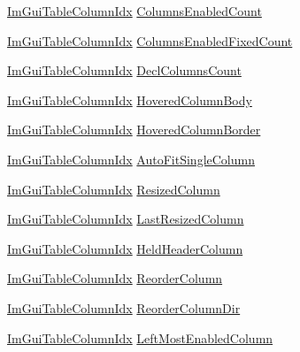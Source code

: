 \begin{DoxyCompactItemize}
\item 
\hyperlink{imgui__internal_8h_abe1882c8292cd23a77a54eda2407f147}{Im\+Gui\+Table\+Column\+Idx} \hyperlink{structImGuiTable_a51e7f9180f9739e52406c2192aa627f9}{Columns\+Enabled\+Count}
\item 
\hyperlink{imgui__internal_8h_abe1882c8292cd23a77a54eda2407f147}{Im\+Gui\+Table\+Column\+Idx} \hyperlink{structImGuiTable_aedc6edf409c9668781496fe16d19958b}{Columns\+Enabled\+Fixed\+Count}
\item 
\hyperlink{imgui__internal_8h_abe1882c8292cd23a77a54eda2407f147}{Im\+Gui\+Table\+Column\+Idx} \hyperlink{structImGuiTable_a8f405d885f74a82872edd0dab5790789}{Decl\+Columns\+Count}
\item 
\hyperlink{imgui__internal_8h_abe1882c8292cd23a77a54eda2407f147}{Im\+Gui\+Table\+Column\+Idx} \hyperlink{structImGuiTable_a3a94c100bab9cb7a01a02360aaf3b323}{Hovered\+Column\+Body}
\item 
\hyperlink{imgui__internal_8h_abe1882c8292cd23a77a54eda2407f147}{Im\+Gui\+Table\+Column\+Idx} \hyperlink{structImGuiTable_a1c47654491f288507621e4b2231b4f89}{Hovered\+Column\+Border}
\item 
\hyperlink{imgui__internal_8h_abe1882c8292cd23a77a54eda2407f147}{Im\+Gui\+Table\+Column\+Idx} \hyperlink{structImGuiTable_a393160a00b60d647071b9f2925e5161e}{Auto\+Fit\+Single\+Column}
\item 
\hyperlink{imgui__internal_8h_abe1882c8292cd23a77a54eda2407f147}{Im\+Gui\+Table\+Column\+Idx} \hyperlink{structImGuiTable_af1ef3df199510dd5210d6501ce6c3996}{Resized\+Column}
\item 
\hyperlink{imgui__internal_8h_abe1882c8292cd23a77a54eda2407f147}{Im\+Gui\+Table\+Column\+Idx} \hyperlink{structImGuiTable_ad5ceb30e1aef45ce269fc661c5e89281}{Last\+Resized\+Column}
\item 
\hyperlink{imgui__internal_8h_abe1882c8292cd23a77a54eda2407f147}{Im\+Gui\+Table\+Column\+Idx} \hyperlink{structImGuiTable_af90fbb7f2d6eba59a140c7dc9e163615}{Held\+Header\+Column}
\item 
\hyperlink{imgui__internal_8h_abe1882c8292cd23a77a54eda2407f147}{Im\+Gui\+Table\+Column\+Idx} \hyperlink{structImGuiTable_afe40dc28725db705210bd3a920aea591}{Reorder\+Column}
\item 
\hyperlink{imgui__internal_8h_abe1882c8292cd23a77a54eda2407f147}{Im\+Gui\+Table\+Column\+Idx} \hyperlink{structImGuiTable_a39d9e079bb8f4073e5b02806d890b59b}{Reorder\+Column\+Dir}
\item 
\hyperlink{imgui__internal_8h_abe1882c8292cd23a77a54eda2407f147}{Im\+Gui\+Table\+Column\+Idx} \hyperlink{structImGuiTable_aaf5f34705f41f958a897d211168f083f}{Left\+Most\+Enabled\+Column}

\end{DoxyCompactItemize}
